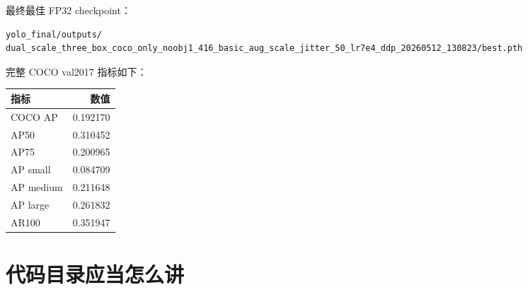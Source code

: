 \documentclass[11pt,a4paper]{article}
\begin{document}
最终最佳 FP32 checkpoint：

\begin{Verbatim}[fontsize=\small]
yolo_final/outputs/
dual_scale_three_box_coco_only_noobj1_416_basic_aug_scale_jitter_50_lr7e4_ddp_20260512_130823/best.pth
\end{Verbatim}

完整 COCO val2017 指标如下：

\begin{table}[H]
\centering
\begin{tabular}{lr}
\toprule
指标 & 数值 \\
\midrule
COCO AP & 0.192170 \\
AP50 & 0.310452 \\
AP75 & 0.200965 \\
AP small & 0.084709 \\
AP medium & 0.211648 \\
AP large & 0.261832 \\
AR100 & 0.351947 \\
\bottomrule
\end{tabular}
\end{table}

\section{代码目录应当怎么讲}
\end{document}

